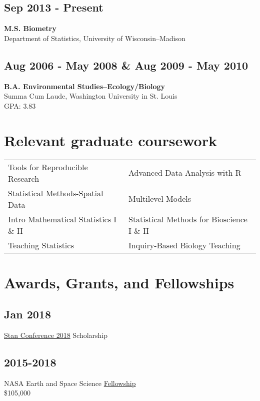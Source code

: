 \documentclass{article}
\begin{document}
\subsection*{Sep 2013 - Present}
\label{sec:org5d7ed49}
\textbf{M.S. Biometry} \\
Department of Statistics, University of Wisconsin--Madison

\subsection*{Aug 2006 - May 2008 \& Aug 2009 - May 2010}
\label{sec:orga07b7df}
\textbf{B.A. Environmental Studies--Ecology/Biology} \\
Summa Cum Laude, Washington University in St. Louis \\
GPA: 3.83

\section*{Relevant graduate coursework}
\label{sec:org034e6ec}
\begin{center}
\begin{tabular}{ll}
Tools for Reproducible Research & Advanced Data Analysis with R\\
Statistical Methods-Spatial Data & Multilevel Models\\
Intro Mathematical Statistics I \& II & Statistical Methods for Bioscience I \& II\\
Teaching Statistics & Inquiry-Based Biology Teaching\\
\end{tabular}
\end{center}

\section*{Awards, Grants, and Fellowships}
\label{sec:org1b7866a}
\subsection*{Jan 2018}
\label{sec:org3b862ca}
\href{http://mc-stan.org/events/}{Stan Conference 2018} Scholarship

\subsection*{2015-2018}
\label{sec:orgf52355f}
NASA Earth and Space Science \href{https://nspires.nasaprs.com/external/viewrepositorydocument/cmdocumentid=459947/solicitationId=\%7BB6CDCEA6-8EDD-A48A-FAF8-E588F66661C3\%7D/viewSolicitationDocument=1/NESSF15\%20selections.pdf}{Fellowship}\\
\$105,000
\end{document}

